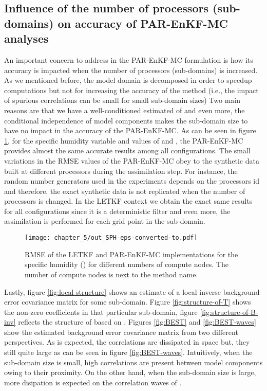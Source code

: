 \documentclass[12pt]{article}
\begin{document}
\subsection{Influence of the number of processors (sub-domains) on accuracy of PAR-EnKF-MC analyses}
\label{subsec:accuracy-PAR-EnKF-MC}
An important concern to address in the PAR-EnKF-MC formulation is how its accuracy is impacted when the number of processors (sub-domains) is increased. As we mentioned before, the model domain is decomposed in order to speedup computations but not for increasing the accuracy of the method (i.e., the impact of spurious correlations can be small for small sub-domain sizes) Two main reasons are that we have a well-conditioned estimated of  and even more, the conditional independence of model components makes the sub-domain size to have no impact in the accuracy of the PAR-EnKF-MC. As can be seen in figure \ref{fig:different-variables-processors}, for the specific humidity variable and values of  and , the PAR-EnKF-MC provides almost the same accurate results among all configurations. The small variations in the RMSE values of the PAR-EnKF-MC obey to the synthetic data built at different processors during the assimilation step. For instance, the random number generators used in the experiments depends on the processors id and therefore, the exact synthetic data is not replicated when the number of processors is changed. In the LETKF context we obtain the exact same results for all configurations since it is a deterministic filter and even more, the assimilation is performed for each grid point in the sub-domain.
\begin{figure}[htp]
\centering


\texttt{[image: chapter\_5/out\_SPH-eps-converted-to.pdf]}
\caption{RMSE of the LETKF and PAR-EnKF-MC implementations for the specific humidity () for different numbers of compute nodes. The number of compute nodes is next to the method name.}
\label{fig:different-variables-processors}
\end{figure}
Lastly, figure \ref{fig:local-structure} shows an estimate of a local inverse background error covariance matrix for some sub-domain. Figure \ref{fig:structure-of-T} shows the non-zero coefficients in that particular sub-domain, figure \ref{fig:structure-of-B-inv} reflects the structure of  based on . Figures \ref{fig:BEST} and \ref{fig:BEST-waves} show the estimated background error covariance matrix  from two different perspectives. As is expected, the correlations are dissipated in space but, they still quite large as can be seen in figure \ref{fig:BEST-waves}. Intuitively, when the sub-domain size is small, high correlations are present between model components owing to their proximity. On the other hand, when the sub-domain size is large, more disipation is expected on the correlation waves of .
\end{document}
